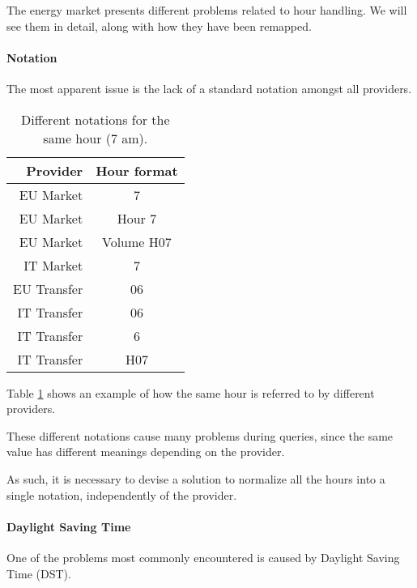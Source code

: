 The energy market presents different problems related to hour handling.
We will see them in detail, along with how they have been remapped.

\paragraph{Notation}
    The most apparent issue is the lack of a standard notation amongst all providers.
    
    \begin{table}
        \centering
        \begin{tabular}{|r|c|}
            \toprule
            Provider        & Hour format   \\
            \midrule
            EU Market 	    & 7             \\
            EU Market 	    & Hour 7        \\
            EU Market 	    & Volume H07    \\
            IT Market       & 7             \\
            EU Transfer     & 06            \\
            IT Transfer     & 06            \\
            IT Transfer     & 6             \\
            IT Transfer     & H07           \\
            \bottomrule
        \end{tabular}
        \caption{Different notations for the same hour (7 am).}
        \label{tab:dwh:remapping:hour:notation:7}
    \end{table}
    
    Table \ref{tab:dwh:remapping:hour:notation:7} shows an example of how the same hour is referred to by different providers.
    
    These different notations cause many problems during queries, since the same value has different meanings depending on the provider.
    
    As such, it is necessary to devise a solution to normalize all the hours into a single notation, independently of the provider.
    
\paragraph{Daylight Saving Time} \label{section:dwh:dst}
    One of the problems most commonly encountered is caused by Daylight Saving Time (DST).
    
